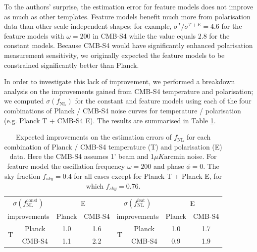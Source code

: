 To the authors' surprise, the estimation error for feature models does not improve as much as other templates. Feature models benefit much more from polarisation data than other scale independent shapes; for example, $\sigma^{T}/\sigma^{T+E} = 4.6$ for the feature models with $\omega=200$ in CMB-S4 while the value equals 2.8 for the constant models. Because CMB-S4 would have significantly enhanced polarisation measurement sensitivity, we originally expected the feature models to be constrained significantly better than Planck.

In order to investigate this lack of improvement, we performed a breakdown analysis on the improvements gained from CMB-S4 temperature and polarisation; we computed $\sigma(f_\text{NL})$ for the constant and feature models using each of the four combinations of Planck / CMB-S4 noise curves for temperature / polarisation (e.g. Planck T + CMB-S4 E). The results are summarised in Table \ref{forecast mixed}.

\begin{table}[ht]
	\centering
	\renewcommand{\arraystretch}{1.5}
	\begin{tabular}{c c c c c c c c}
		\toprule
		\multicolumn{2}{c}{$\sigma(f_\text{NL}^\text{const})$}  &  \multicolumn{2}{c}{E}  & \multicolumn{2}{c}{$\sigma(f_\text{NL}^\text{feat})$}  &  \multicolumn{2}{c}{E}  \\
		\cmidrule(lr){3-4} \cmidrule(lr){7-8} 
		\multicolumn{2}{c}{improvements}  & Planck & CMB-S4 & \multicolumn{2}{c}{improvements}  & Planck & CMB-S4 \\
		\cmidrule(lr){1-4} \cmidrule(lr){5-8}
		\multirow{2}{*}{T} & Planck & 1.0 & 1.6 & \multirow{2}{*}{T} & Planck & 1.0 & 1.7 \\
		& CMB-S4 & 1.1 & 2.2 & & CMB-S4 & 0.9 & 1.9 \\
		\bottomrule
	\end{tabular}
	\caption{Expected improvements on the estimation errors of $f_\text{NL}$ for each combination of Planck / CMB-S4 temperature (T) and polarisation (E) data. Here the CMB-S4 assumes 1' beam and 1$\mu K$arcmin noise. For feature model the oscillation frequency $\omega=200$ and phase $\phi=0$. The sky fraction $f_{sky}=0.4$ for all cases except for Planck T + Planck E, for which $f_{sky}=0.76$.}
	\label{forecast mixed}
\end{table}

